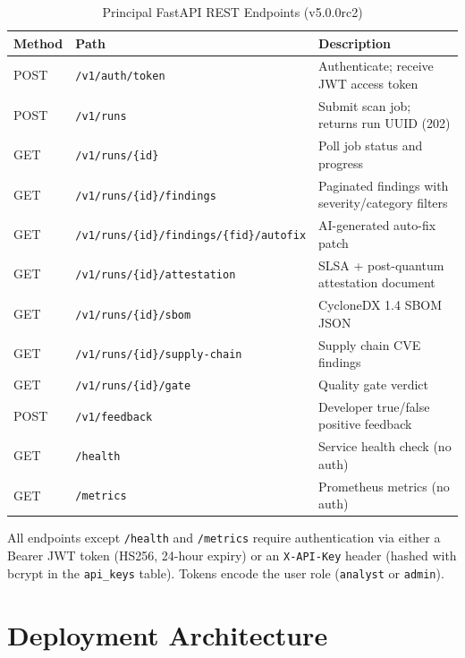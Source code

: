 \begin{table}[htbp]
\caption{Principal FastAPI REST Endpoints (v5.0.0rc2)}
\label{tab:api_endpoints}
\centering
\renewcommand{\arraystretch}{1.3}
\begin{tabularx}{\textwidth}{@{} l l X @{}}
\toprule
\textbf{Method} & \textbf{Path} & \textbf{Description} \\
\midrule
POST   & \texttt{/v1/auth/token}              & Authenticate; receive JWT access token \\
POST   & \texttt{/v1/runs}                    & Submit scan job; returns run UUID (202) \\
GET    & \texttt{/v1/runs/\{id\}}             & Poll job status and progress \\
GET    & \texttt{/v1/runs/\{id\}/findings}    & Paginated findings with severity/category filters \\
GET    & \texttt{/v1/runs/\{id\}/findings/\{fid\}/autofix} & AI-generated auto-fix patch \\
GET    & \texttt{/v1/runs/\{id\}/attestation} & SLSA + post-quantum attestation document \\
GET    & \texttt{/v1/runs/\{id\}/sbom}        & CycloneDX 1.4 SBOM JSON \\
GET    & \texttt{/v1/runs/\{id\}/supply-chain} & Supply chain CVE findings \\
GET    & \texttt{/v1/runs/\{id\}/gate}        & Quality gate verdict \\
POST   & \texttt{/v1/feedback}                & Developer true/false positive feedback \\
GET    & \texttt{/health}                     & Service health check (no auth) \\
GET    & \texttt{/metrics}                    & Prometheus metrics (no auth) \\
\bottomrule
\end{tabularx}
\end{table}

All endpoints except \texttt{/health} and \texttt{/metrics} require authentication via either a Bearer JWT token (HS256, 24-hour expiry) or an \texttt{X-API-Key} header (hashed with bcrypt in the \texttt{api\_keys} table). Tokens encode the user role (\texttt{analyst} or \texttt{admin}).

\section{Deployment Architecture}
\label{sec:deployment}

